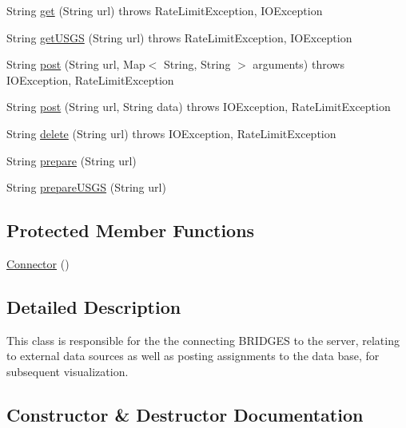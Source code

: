 \begin{DoxyCompactItemize}
\item 
String \mbox{\hyperlink{classbridges_1_1connect_1_1_connector_aec8d54bf707c50d6f8173a0c1640fcd5}{get}} (String url)  throws Rate\+Limit\+Exception, I\+O\+Exception 
\item 
String \mbox{\hyperlink{classbridges_1_1connect_1_1_connector_a1781405c9b38c338bce042bf7ff23eaf}{get\+U\+S\+GS}} (String url)  throws Rate\+Limit\+Exception, I\+O\+Exception 
\item 
String \mbox{\hyperlink{classbridges_1_1connect_1_1_connector_a88e465aed707d59b96958dcc946ff6b4}{post}} (String url, Map$<$ String, String $>$ arguments)  throws I\+O\+Exception, Rate\+Limit\+Exception 
\item 
String \mbox{\hyperlink{classbridges_1_1connect_1_1_connector_a4b8978743a8c230b86500f5a00cb2697}{post}} (String url, String data)  throws I\+O\+Exception, 		\+Rate\+Limit\+Exception 
\item 
String \mbox{\hyperlink{classbridges_1_1connect_1_1_connector_ac0a6f796f1ebcf312b89a7d233c8ac91}{delete}} (String url)  throws I\+O\+Exception, Rate\+Limit\+Exception 
\item 
String \mbox{\hyperlink{classbridges_1_1connect_1_1_connector_a507ee5a9d8c812ffd4629cbd22f27373}{prepare}} (String url)
\item 
String \mbox{\hyperlink{classbridges_1_1connect_1_1_connector_aa0201e2569358ff906d3c14d654711e5}{prepare\+U\+S\+GS}} (String url)
\end{DoxyCompactItemize}
\subsection*{Protected Member Functions}
\begin{DoxyCompactItemize}
\item 
\mbox{\hyperlink{classbridges_1_1connect_1_1_connector_a167800699b2d191bd625d9c8c8cd9e6f}{Connector}} ()
\end{DoxyCompactItemize}


\subsection{Detailed Description}
This class is responsible for the the connecting B\+R\+I\+D\+G\+ES to the server, relating to external data sources as well as posting assignments to the data base, for subsequent visualization. 

\subsection{Constructor \& Destructor Documentation}
\mbox{\label{classbridges_1_1connect_1_1_connector_a167800699b2d191bd625d9c8c8cd9e6f}} 
